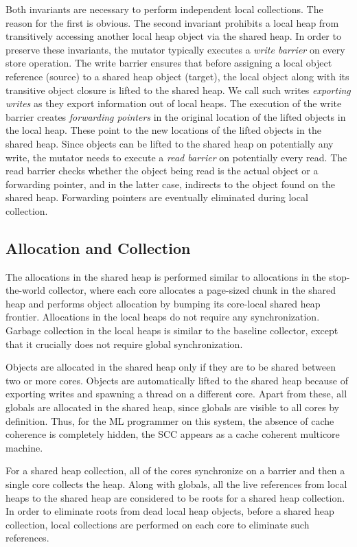 \noindent Both invariants are necessary to perform independent local
collections.  The reason for the first is obvious.  The second invariant
prohibits a local heap from transitively accessing another local heap object
via the shared heap.  In order to preserve these invariants, the mutator
typically executes a \emph{write barrier} on every store operation. The write
barrier ensures that before assigning a local object reference (source) to a
shared heap object (target), the local object along with its transitive object
closure is lifted to the shared heap. We call such writes \emph{exporting
writes} as they export information out of local heaps.  The execution of the
write barrier creates \emph{forwarding pointers} in the original location of
the lifted objects in the local heap. These point to the new locations of the
lifted objects in the shared heap. Since objects can be lifted to the shared
heap on potentially any write, the mutator needs to execute a \emph{read
barrier} on potentially every read. The read barrier checks whether the object
being read is the actual object or a forwarding pointer, and in the latter
case, indirects to the object found on the shared heap.  Forwarding pointers
are eventually eliminated during local collection.

\subsection{Allocation and Collection}

The allocations in the shared heap is performed similar to allocations in the
stop-the-world collector, where each core allocates a page-sized chunk in the
shared heap and performs object allocation by bumping its core-local shared
heap frontier. Allocations in the local heaps do not require any
synchronization. Garbage collection in the local heaps is similar to the
baseline collector, except that it crucially does not require global
synchronization.

Objects are allocated in the shared heap only if they are to be shared between
two or more cores. Objects are automatically lifted to the shared heap because
of exporting writes and spawning a thread on a different core. Apart from
these, all globals are allocated in the shared heap, since globals are visible
to all cores by definition. Thus, for the ML programmer on this system, the
absence of cache coherence is completely hidden, the SCC appears as a cache
coherent multicore machine.

For a shared heap collection, all of the cores synchronize on a barrier and
then a single core collects the heap. Along with globals, all the live
references from local heaps to the shared heap are considered to be roots for a
shared heap collection. In order to eliminate roots from dead local heap
objects, before a shared heap collection, local collections are performed on
each core to eliminate such references.

